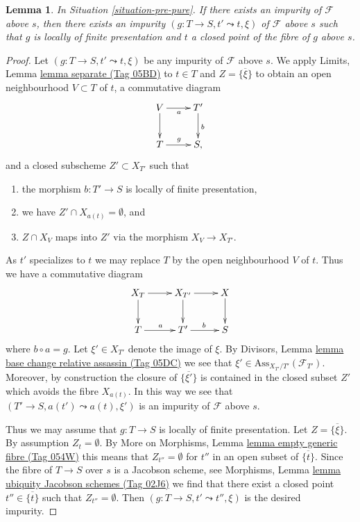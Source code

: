 \documentclass{amsart}
\theoremstyle{plain}
\newtheorem{lemma}[subsection]{Lemma}
\theoremstyle{definition}
\theoremstyle{remark}
\numberwithin{equation}{subsection}
\begin{document}
\begin{lemma}
\label{lemma-impure-finite-presentation}
In Situation \ref{situation-pre-pure}.
If there exists an impurity of $\mathcal{F}$ above $s$, then
there exists an impurity $(g : T \to S, t' \leadsto t, \xi)$
of $\mathcal{F}$ above $s$ such that $g$ is locally of finite
presentation and $t$ a closed point of the fibre of $g$ above $s$.
\end{lemma}

\begin{proof}
Let $(g : T \to S, t' \leadsto t, \xi)$ be any impurity of
$\mathcal{F}$ above $s$. We apply
Limits, Lemma \href{https://stacks.math.columbia.edu/tag/05BD}{lemma separate (Tag 05BD)}
to $t \in T$ and $Z = \overline{\{\xi\}}$ to obtain an open neighbourhood
$V \subset T$ of $t$, a commutative diagram
$$
\xymatrix{
V \ar[d] \ar[r]_a & T' \ar[d]^b \\
T \ar[r]^g & S,
}
$$
and a closed subscheme $Z' \subset X_{T'}$ such that
\begin{enumerate}
\item the morphism $b : T' \to S$ is locally of finite presentation,
\item we have $Z' \cap X_{a(t)} = \emptyset$, and
\item $Z \cap X_V$ maps into $Z'$ via the morphism $X_V \to X_{T'}$.
\end{enumerate}
As $t'$ specializes to $t$ we may replace $T$ by the open neighbourhood
$V$ of $t$. Thus we have a commutative diagram
$$
\xymatrix{
X_T \ar[d] \ar[r] &
X_{T'} \ar[d] \ar[r] &
X \ar[d] \\
T \ar[r]^a & T' \ar[r]^b & S
}
$$
where $b \circ a = g$. Let $\xi' \in X_{T'}$ denote the
image of $\xi$. By
Divisors, Lemma \href{https://stacks.math.columbia.edu/tag/05DC}{lemma base change relative assassin (Tag 05DC)}
we see that $\xi' \in \text{Ass}_{X_{T'}/T'}(\mathcal{F}_{T'})$.
Moreover, by construction the closure of $\overline{\{\xi'\}}$
is contained in the closed subset $Z'$ which avoids the fibre
$X_{a(t)}$. In this way we see that $(T' \to S, a(t') \leadsto a(t), \xi')$
is an impurity of $\mathcal{F}$ above $s$.

\medskip\noindent
Thus we may assume that $g : T \to S$ is locally of finite presentation.
Let $Z = \overline{\{\xi\}}$. By assumption $Z_t = \emptyset$. By
More on Morphisms, Lemma \href{https://stacks.math.columbia.edu/tag/054W}{lemma empty generic fibre (Tag 054W)}
this means that $Z_{t''} = \emptyset$ for $t''$ in an open subset
of $\overline{\{t\}}$. Since the fibre of
$T \to S$ over $s$ is a Jacobson scheme, see
Morphisms, Lemma \href{https://stacks.math.columbia.edu/tag/02J6}{lemma ubiquity Jacobson schemes (Tag 02J6)}
we find that there exist a closed point $t'' \in \overline{\{t\}}$ such that
$Z_{t''} = \emptyset$. Then $(g : T \to S, t' \leadsto t'', \xi)$ is the
desired impurity.
\end{proof}
\end{document}
